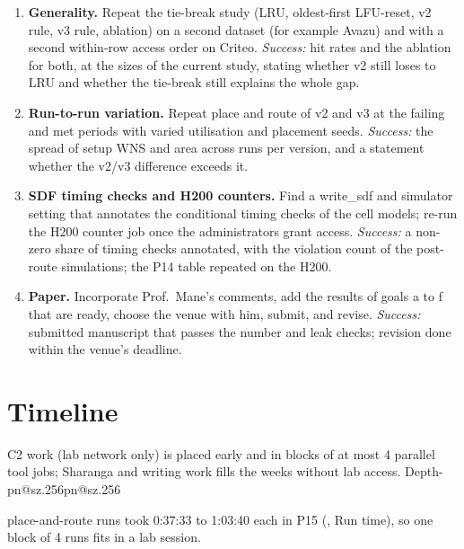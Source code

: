 \documentclass[11pt,a4paper]{article}
\makeatletter
\newcommand{\R}[1]{\ifcsname pn@#1\endcsname\csname pn@#1\endcsname\else
  \PackageError{plan}{number key '#1' is not defined in paper/v2/macros.tex}{}\fi}
\makeatother
\begin{document}
\begin{enumerate}[label=\textbf{\alph*.},leftmargin=1.6em]
\item \textbf{Generality.} Repeat the tie-break study (LRU, oldest-first LFU-reset, v2 rule, v3 rule, ablation) on a
second dataset (for example Avazu) and with a second within-row access order on Criteo.
\emph{Success:} hit rates and the ablation for both, at the sizes of the current study, stating whether v2 still
loses to LRU and whether the tie-break still explains the whole gap.

\item \textbf{Run-to-run variation.} Repeat place and route of v2 and v3 at the failing and met periods with varied
utilisation and placement seeds.
\emph{Success:} the spread of setup WNS and area across runs per version, and a statement whether the v2/v3
difference exceeds it.

\item \textbf{SDF timing checks and H200 counters.} Find a write\_sdf and simulator setting that annotates the
conditional timing checks of the cell models; re-run the H200 counter job once the administrators grant access.
\emph{Success:} a non-zero share of timing checks annotated, with the violation count of the post-route
simulations; the P14 table repeated on the H200.

\item \textbf{Paper.} Incorporate Prof.\ Mane's comments, add the results of goals a to f that are ready, choose
the venue with him, submit, and revise.
\emph{Success:} submitted manuscript that passes the number and leak checks; revision done within the venue's
deadline.
\end{enumerate}

\section{Timeline}
C2 work (lab network only) is placed early and in blocks of at most 4 parallel tool jobs; Sharanga and writing work
fills the weeks without lab access. Depth-\R{sz.256} place-and-route runs took 0:37:33 to 1:03:40 each in P15
(, Run time), so one block of 4 runs fits in a lab session.
\end{document}
